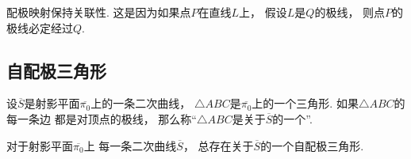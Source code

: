 配极映射保持关联性.
这是因为如果点\(P\)在直线\(L\)上，
假设\(L\)是\(Q\)的极线，
则点\(P\)的极线必定经过\(Q\).

\subsection{自配极三角形}
\begin{definition}
设\(\overline{S}\)是射影平面\(\overline{\pi_0}\)上的一条二次曲线，
\(\triangle ABC\)是\(\overline{\pi_0}\)上的一个三角形.
如果\(\triangle ABC\)的每一条边
都是对顶点的极线，
那么称“\(\triangle ABC\)是关于\(\overline{S}\)的一个”.
\end{definition}

\begin{theorem}
对于射影平面\(\overline{\pi_0}\)上
每一条二次曲线\(\overline{S}\)，
总存在关于\(\overline{S}\)的一个自配极三角形.
\end{theorem}
